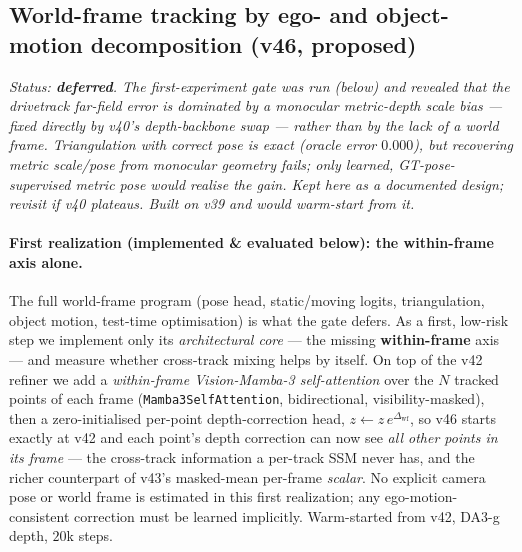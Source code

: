 \documentclass[11pt,a4paper]{article}
\begin{document}
\subsection{World-frame tracking by ego- and object-motion decomposition (v46, proposed)}
\label{sec:v46}
\emph{Status: \textbf{deferred}. The first-experiment gate was run (below) and revealed that the drivetrack
far-field error is dominated by a monocular metric-depth \emph{scale} bias --- fixed directly by v40's
depth-backbone swap --- rather than by the lack of a world frame. Triangulation with correct pose is exact
(oracle error $0.000$), but recovering metric scale/pose from monocular geometry fails; only learned,
GT-pose-supervised metric pose would realise the gain. Kept here as a documented design; revisit if v40
plateaus. Built on v39 and would warm-start from it.}

\paragraph{First realization (implemented \& evaluated below): the within-frame axis alone.}
The full world-frame program (pose head, static/moving logits, triangulation, object motion, test-time
optimisation) is what the gate defers. As a first, low-risk step we implement only its \emph{architectural
core} --- the missing \textbf{within-frame} axis --- and measure whether cross-track mixing helps by itself.
On top of the v42 refiner we add a \emph{within-frame Vision-Mamba-3 self-attention} over the $N$ tracked
points of each frame (\texttt{Mamba3SelfAttention}, bidirectional, visibility-masked), then a
zero-initialised per-point depth-correction head, $z\leftarrow z\,e^{\Delta_{\text{wf}}}$, so v46 starts
exactly at v42 and each point's depth correction can now see \emph{all other points in its frame} --- the
cross-track information a per-track SSM never has, and the richer counterpart of v43's masked-mean per-frame
\emph{scalar}. No explicit camera pose or world frame is estimated in this first realization; any
ego-motion-consistent correction must be learned implicitly. Warm-started from v42, DA3-g depth, $20$k
steps.
\end{document}
